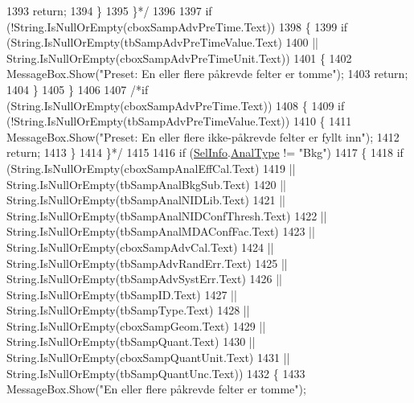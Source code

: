 \begin{DoxyCode}
1393 \textcolor{comment}{                    return;}
1394 \textcolor{comment}{                \}}
1395 \textcolor{comment}{            \}*/}
1396 
1397             \textcolor{keywordflow}{if} (!String.IsNullOrEmpty(cboxSampAdvPreTime.Text))
1398             \{
1399                 \textcolor{keywordflow}{if} (String.IsNullOrEmpty(tbSampAdvPreTimeValue.Text)
1400                     || String.IsNullOrEmpty(cboxSampAdvPreTimeUnit.Text))
1401                 \{
1402                     MessageBox.Show(\textcolor{stringliteral}{"Preset: En eller flere påkrevde felter er tomme"});
1403                     \textcolor{keywordflow}{return};
1404                 \}
1405             \}
1406 
1407             \textcolor{comment}{/*if (String.IsNullOrEmpty(cboxSampAdvPreTime.Text))}
1408 \textcolor{comment}{            \{}
1409 \textcolor{comment}{                if (!String.IsNullOrEmpty(tbSampAdvPreTimeValue.Text))}
1410 \textcolor{comment}{                \{}
1411 \textcolor{comment}{                    MessageBox.Show("Preset: En eller flere ikke-påkrevde felter er fyllt inn");}
1412 \textcolor{comment}{                    return;}
1413 \textcolor{comment}{                \}}
1414 \textcolor{comment}{            \}*/}
1415 
1416             \textcolor{keywordflow}{if} (\hyperlink{class_scintilab_1_1_form_main_a57c8340ae2caaec775ad70d8036514fb}{SelInfo}.\hyperlink{class_scintilab_1_1_selection_info_aba3d0673e0d48ee2e2320fdb18179650}{AnalType} != \textcolor{stringliteral}{"Bkg"})
1417             \{
1418                 \textcolor{keywordflow}{if} (String.IsNullOrEmpty(cboxSampAnalEffCal.Text)
1419                     || String.IsNullOrEmpty(tbSampAnalBkgSub.Text)
1420                     || String.IsNullOrEmpty(tbSampAnalNIDLib.Text)
1421                     || String.IsNullOrEmpty(tbSampAnalNIDConfThresh.Text)
1422                     || String.IsNullOrEmpty(tbSampAnalMDAConfFac.Text)
1423                     || String.IsNullOrEmpty(cboxSampAdvCal.Text)
1424                     || String.IsNullOrEmpty(tbSampAdvRandErr.Text)
1425                     || String.IsNullOrEmpty(tbSampAdvSystErr.Text)
1426                     || String.IsNullOrEmpty(tbSampID.Text)
1427                     || String.IsNullOrEmpty(tbSampType.Text)
1428                     || String.IsNullOrEmpty(cboxSampGeom.Text)
1429                     || String.IsNullOrEmpty(tbSampQuant.Text)
1430                     || String.IsNullOrEmpty(cboxSampQuantUnit.Text)
1431                     || String.IsNullOrEmpty(tbSampQuantUnc.Text))
1432                 \{
1433                     MessageBox.Show(\textcolor{stringliteral}{"En eller flere påkrevde felter er tomme"});

\end{DoxyCode}
